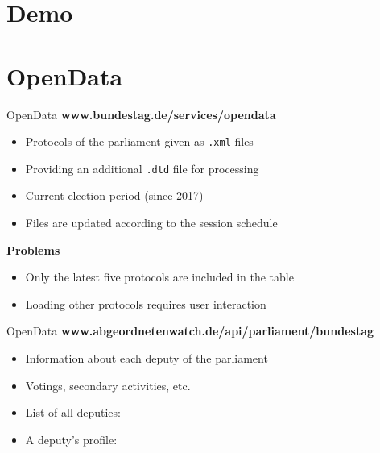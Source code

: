 \documentclass{beamer}
\begin{document}
  \section{Demo}

  \section{OpenData}
  \begin{frame}[plain]{OpenData}
    \textbf{\faAt}\quad\textbf{www.bundestag.de/services/opendata}
    \begin{itemize}
      \item Protocols of the parliament given as \texttt{.xml} files
      \item Providing an additional \texttt{.dtd} file for processing
      \item Current election period (since 2017)
      \item Files are updated according to the session schedule
    \end{itemize}
    \textbf{\faExclamationTriangle}\quad\textbf{Problems}
    \begin{itemize}
      \item Only the latest five protocols are included in the table
      \item Loading other protocols requires user interaction
    \end{itemize}  
  \end{frame}

  \begin{frame}[plain]{OpenData}
    \textbf{\faAt}\quad\textbf{www.abgeordnetenwatch.de/api/parliament/bundestag}
    \begin{itemize}
      \item Information about each deputy of the parliament
      \item Votings, secondary activities, etc.
      \item List of all deputies:  
      \item A deputy's profile: 
    \end{itemize}
  \end{frame}
\end{document}
